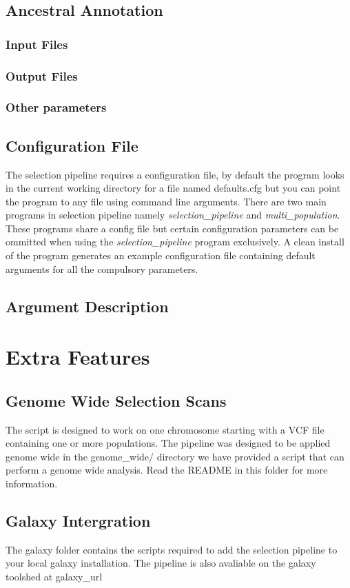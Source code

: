 \documentclass[a4paper,10pt]{article}
\begin{document}
\subsection{Ancestral Annotation}
\subsubsection{Input Files}
\subsubsection{Output Files}
\subsubsection{Other parameters}

\subsection{Configuration File}
The selection pipeline requires a configuration file, by default the program looks in the current working directory for a file named defaults.cfg but you can point the program to any file using command line arguments. There are two main programs in selection pipeline namely \emph{selection\_pipeline} and \emph{multi\_population}. These programs share a config file but certain configuration parameters can be ommitted when using the \emph{selection\_pipeline} program exclusively. A clean install of the program generates an example configuration file containing default arguments for all the compulsory parameters.
\subsection{Argument Description}


\section{Extra Features}

\subsection{Genome Wide Selection Scans}
The script is designed to work on one chromosome starting with a VCF file containing one or more populations. The pipeline was designed to be applied genome wide in the genome\_wide/ directory we have provided a script that can perform a genome wide analysis. Read the README in this folder for more information.
\subsection{Galaxy Intergration}
The galaxy folder contains the scripts required to add the selection pipeline to your local galaxy installation. The pipeline is also avaliable on the galaxy toolshed at galaxy\_url




\end{document}
